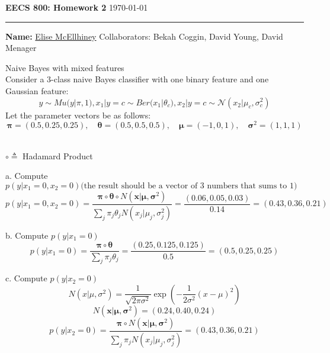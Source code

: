 \documentclass[draft]{exam} %
\theoremstyle{definition} \newtheorem*{defn}{Definition}
\begin{document}
\noindent\textbf{\large{EECS 800: Homework 2}} \hfill \today
\hrule \bigskip
\noindent \textbf{Name:} \underline{Elise McEllhiney} \qquad Collaborators: Bekah Coggin, David Young, David Menager

\begin{questions} \printanswers

 Naive Bayes with mixed features \\
Consider a 3-class naive Bayes classifier with one binary feature and one Gaussian feature:
$$y \sim Mu( y | \pi , 1 ), x_1 | y = c \sim Ber( x_1 | \theta_c ), x_2 | y = c \sim \mathcal{N} ( x_2 | \mu_c , \sigma_c^2 )$$
Let the parameter vectors be as follows:
$$\pmb{\pi} = (0.5, 0.25, 0.25), \quad \pmb{\theta} = (0.5, 0.5, 0.5), \quad \pmb{\mu} = (-1, 0, 1), \quad \pmb{\sigma}^2 = (1, 1, 1)$$

\begin{solution} \\ %
$\circ \triangleq$ Hadamard Product

a. Compute $p( y | x_1 = 0, x_2 =  0 ) \text{(the result should be a vector of 3 numbers that sums to 1)}$\\
$$p(y|x_1=0, x_2=0) = \frac{\pmb{\pi}\circ\pmb{\theta}\circ N(\pmb{x} | \pmb{\mu}, \pmb{\sigma}^2 )}{\sum_j \pi_j \theta_j N(x_j | \mu_j, \sigma_j^2 )} = \frac{(0.06, 0.05, 0.03)}{0.14} = (0.43, 0.36, 0.21)$$

b. Compute $p( y | x_1 = 0 )$\\
$$p(y | x_1 = 0) = \frac{\pmb{\pi}\circ \pmb{\theta}}{\sum_j \pi_j \theta_j} = \frac{(0.25, 0.125, 0.125)}{0.5} = (0.5, 0.25, 0.25)$$

c. Compute $p( y | x_2 = 0 )$\\
$$N(x|\mu, \sigma^2) = \frac{1}{\sqrt{2 \pi \sigma^2 }}\exp{(-\frac{1}{2 \sigma^2}(x-\mu)^2)}$$
$$N(\pmb{x} | \pmb{\mu}, \pmb{\sigma}^2 ) = (0.24, 0.40, 0.24)$$
$$p(y | x_2 = 0) =  \frac{\pmb{\pi}\circ N(\pmb{x} | \pmb{\mu}, \pmb{\sigma}^2 )}{\sum_j \pi_j N(x_j | \mu_j, \sigma_j^2 )} = (0.43, 0.36, 0.21)$$


\end{solution}
\end{questions}
\end{document}
